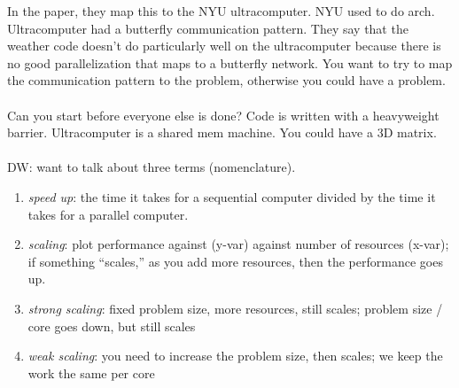 In the paper, they map this to the NYU ultracomputer.
NYU used to do arch.
Ultracomputer had a butterfly communication pattern.
They say that the weather code doesn't do particularly well on the ultracomputer because there is no good parallelization that maps to a butterfly network.
You want to try to map the communication pattern to the problem, otherwise you could have a problem.
\\ \\
Can you start before everyone else is done?
Code is written with a heavyweight barrier.
Ultracomputer is a shared mem machine.
You could have a 3D matrix.
\\ \\
DW: want to talk about three terms (nomenclature).
\begin{enumerate}
    \item \textit{speed up}: the time it takes for a sequential computer divided by the time it takes for a parallel computer.
    \item \textit{scaling}: plot performance against (y-var) against number of resources (x-var); if something ``scales,'' as you add more resources, then the performance goes up.
    \item \textit{strong scaling}: fixed problem size, more resources, still scales; problem size / core goes down, but still scales
    \item \textit{weak scaling}: you need to increase the problem size, then scales; we keep the work the same per core
\end{enumerate}


